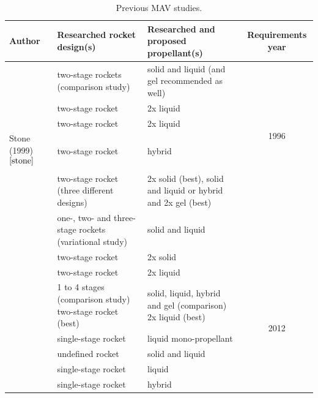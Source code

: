 \begin{table}[H]
\begin{center}
\caption{Previous \ac{MAV} studies.}
\label{tab:refmavstud}
\begin{tabularx}{1.0\textwidth}{|X|X|X|c|}
\hline 
\textbf{Author} 		 &\textbf{Researched rocket design(s)} & \textbf{Researched and proposed propellant(s)} & \textbf{Requirements year} \\ \hline \hline
\cite{whitehead1997} 		& two-stage rockets (comparison study)  & solid and liquid (and gel recommended as well) & \multirow{5}{*}{1996} \\ \cline{1-3}
\cite{guernsey1998} 		& two-stage rocket & 2x liquid &  \\ \cline{1-3}
\cite{desai1998} 	& two-stage rocket & 2x liquid  & \\ \cline{1-3}
Stone (1999)$^{\ref{stone}}$  & two-stage rocket & hybrid & \\ \hline \hline
\cite{stephenson2002} 		& two-stage rocket (three different designs) & 2x solid (best), solid and liquid or hybrid and 2x gel (best)  & \multirow{8}{*}{2000} \\ \cline{1-3}
\cite{whitehead2005} 		& one-, two- and three-stage rockets (variational study)  & solid and liquid  & \\ \cline{1-3}
\cite{stephenson2006} & two-stage rocket & 2x solid & \\ \hline \hline
\cite{sengupta2012} 		& two-stage rocket & 2x liquid  & \multirow{7}{*}{2012} \\ \cline{1-3}
\cite{trinidad2012} 		& 1 to 4 stages (comparison study) two-stage rocket (best)  & solid, liquid, hybrid and gel (comparison) 2x liquid (best) & \\ \cline{1-3}
\cite{mungas2012}	& single-stage rocket & liquid mono-propellant  &  \\ \cline{1-3}
\cite{mppg2012}	 & undefined rocket & solid and liquid & \\ \hline \hline
\cite{vaughan2016technology} & single-stage rocket & liquid & \multirow{2}{*}{2014} \\ \cline{1-3}
\cite{karp2016technology} & single-stage rocket & hybrid & \\ \hline
 		
\end{tabularx}
\end{center}
\end{table} 

